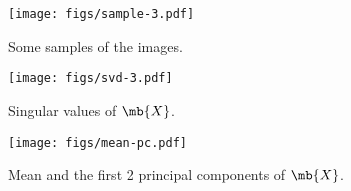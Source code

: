 \newpage
\begin{figure}[H]
    \centering
    \texttt{[image: figs/sample-3.pdf]}
    \caption{Some samples of the images.}
    \label{fig:sample-3}
\end{figure}
\begin{figure}[H]
    \centering
    \texttt{[image: figs/svd-3.pdf]}
    \caption{Singular values of $\mb{X}$.}
    \label{fig:svd-3}
\end{figure}
\begin{figure}[H]
    \centering
    \texttt{[image: figs/mean-pc.pdf]}
    \caption{Mean and the first 2 principal components of $\mb{X}$.}
    \label{fig:mean-pc}
\end{figure}
\clearpage




